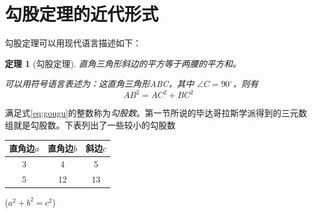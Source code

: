 \documentclass[UTF8]{ctexart} %
\newtheorem{thm}{定理}
\begin{document}
\section{勾股定理的近代形式}%
勾股定理可以用现代语言描述如下：
\begin{thm}[勾股定理]
直角三角形斜边的平方等于两腰的平方和。


可以用符号语言表述为：这直角三角形ABC，其中 $\angle C = 90^\circ$，则有 
\begin{equation}
    \label{eq:gougu}
    AB^2 = AC^2 + BC^2
\end{equation}
\end{thm}
满足式\eqref{eq:gougu}的整数称为\emph{勾股数}。第一节所说的毕达哥拉斯学派得到的三元数组就是勾股数。下表列出了一些较小的勾股数
\begin{table}[H]
\begin{tabular}{|ccc|} %
\hline %
直角边$a$ & 直角边$b$ & 斜边$c$ \\
\hline
3 & 4 & 5 \\
5 & 12 & 13 \\
\hline
\end{tabular}%
\qquad %
($a^2 + b^2 = c^2$)
\end{table}
    
\end{document}
